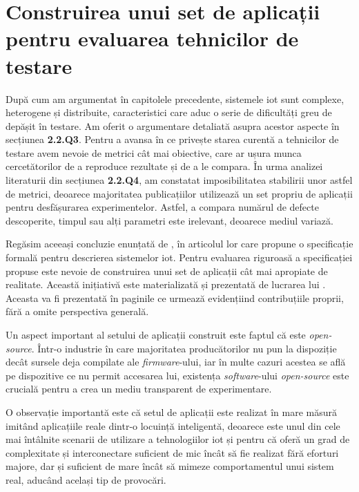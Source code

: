\chapter{Construirea unui set de aplicații pentru evaluarea 
tehnicilor de testare}

După cum am argumentat în capitolele precedente, sistemele \acrshort{iot} sunt complexe, heterogene și distribuite, caracteristici care aduc o serie de dificultăți greu de depășit în testare. Am oferit o argumentare detaliată asupra acestor aspecte în secțiunea \textbf{2.2.Q3}. Pentru a avansa în ce privește starea curentă a tehnicilor de testare avem nevoie de metrici cât mai obiective, care ar ușura munca cercetătorilor de a reproduce rezultate și de a le compara. În urma analizei literaturii din secțiunea \textbf{2.2.Q4}, am constatat imposibilitatea stabilirii unor astfel de metrici, deoarece majoritatea publicațiilor utilizează un set propriu de aplicații pentru desfășurarea experimentelor. Astfel, a compara numărul de defecte descoperite, timpul sau alți parametri este irelevant, deoarece mediul variază. 

Regăsim aceeași concluzie enunțată de \cite{Paduraru2021}, în articolul lor care propune o specificație formală pentru descrierea sistemelor \acrshort{iot}. Pentru evaluarea riguroasă a specificației propuse este nevoie de construirea unui set de aplicații cât mai apropiate de realitate. Această inițiativă este materializată și prezentată de lucrarea lui \cite{Cristea2022}. Aceasta va fi prezentată în paginile ce urmează evidențiind contribuțiile proprii, fără a omite perspectiva generală. 

Un aspect important al setului de aplicații construit este faptul că este \textit{open-source}. Într-o industrie în care majoritatea producătorilor nu pun la dispoziție decât sursele deja compilate ale \textit{firmware}-ului, iar în multe cazuri acestea se află pe dispozitive ce nu permit accesarea lui, existența \textit{software}-ului \textit{open-source} este crucială pentru a crea un mediu transparent de experimentare. 

O observație importantă este că setul de aplicații este realizat în mare măsură imitând aplicațiile reale dintr-o locuință inteligentă, deoarece este unul din cele mai întâlnite scenarii de utilizare a tehnologiilor \acrshort{iot} și pentru că oferă un grad de complexitate și interconectare suficient de mic încât să fie realizat fără eforturi majore, dar și suficient de mare încât să mimeze comportamentul unui sistem real, aducând același tip de provocări.

